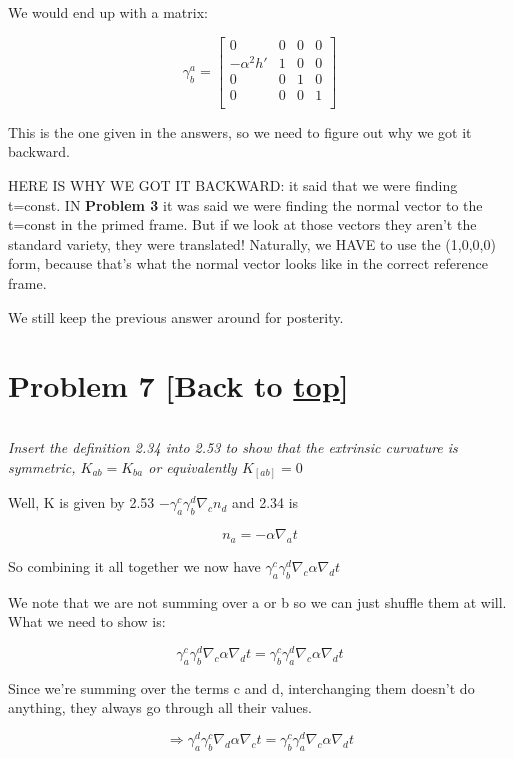 \documentclass[landscape,letterpaper,10pt,english]{article}
\begin{document}
    We would end up with a matrix:

\[ \gamma^a_b = \begin{bmatrix}
0 & 0 & 0 & 0 \\
-\alpha^2h' & 1 & 0 & 0 \\
0 & 0 & 1 & 0 \\
0 & 0 & 0 & 1 \\
\end{bmatrix}\]

This is the one given in the answers, so we need to figure out why we
got it backward.

HERE IS WHY WE GOT IT BACKWARD: it said that we were finding t=const. IN
\textbf{Problem 3} it was said we were finding the normal vector to the
t=const in the primed frame. But if we look at those vectors they aren't
the standard variety, they were translated! Naturally, we HAVE to use
the (1,0,0,0) form, because that's what the normal vector looks like in
the correct reference frame.

We still keep the previous answer around for posterity.

    \hypertarget{problem-7-back-to-top}{%
\section{\texorpdfstring{Problem 7 {[}Back to
\hyperref[toc]{top}{]}}{Problem 7 {[}Back to {]}}}\label{problem-7-back-to-top}}

\[\label{P7}\]

\emph{Insert the definition 2.34 into 2.53 to show that the extrinsic
curvature is symmetric, \(K_{ab} = K_{ba}\) or equivalently
\(K_{[ab]}=0\)}

Well, K is given by 2.53 \(-\gamma^c_a \gamma^d_b \nabla_c n_d\) and
2.34 is

\[ n_a = -\alpha \nabla_a t \]

    So combining it all together we now have
\(\gamma^c_a\gamma^d_b\nabla_c \alpha \nabla_d t\)

    We note that we are not summing over a or b so we can just shuffle them
at will. What we need to show is:

\[\gamma^c_a\gamma^d_b\nabla_c \alpha \nabla_d t = \gamma^c_b\gamma^d_a\nabla_c \alpha \nabla_d t \]

Since we're summing over the terms c and d, interchanging them doesn't
do anything, they always go through all their values.

\[\Rightarrow \gamma^d_a\gamma^c_b\nabla_d \alpha \nabla_c t = \gamma^c_b\gamma^d_a\nabla_c \alpha \nabla_d t \]
\end{document}
